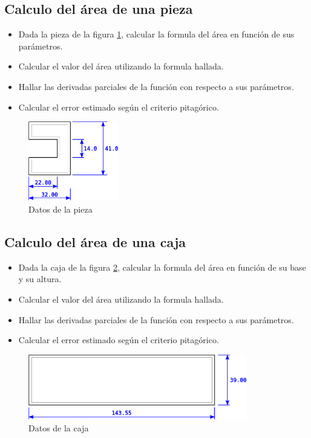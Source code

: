 \documentclass[letter,11pt]{article}
\begin{document}
\subsection{Calculo del área de una pieza}
\begin{itemize}
\item Dada la pieza de la figura \ref{pieza}, calcular la formula del
área en función de sus parámetros.
\item Calcular el valor del área utilizando la formula hallada.
\item Hallar las derivadas parciales de la función con respecto a sus
parámetros.
\item Calcular el error estimado según el criterio pitagórico.
\end{itemize}

\begin{figure}
\centering
\includegraphics[width=0.35\textwidth]{eps/02_03.pieza.eps}
\caption{Datos de la pieza}
\label{pieza}
\end{figure}

\subsection{Calculo del área de una caja}
\begin{itemize}
\item Dada la caja de la figura \ref{caja}, calcular la formula del
área en función de su base y su altura.
\item Calcular el valor del área utilizando la formula hallada.
\item Hallar las derivadas parciales de la función con respecto a sus
parámetros.
\item Calcular el error estimado según el criterio pitagórico.
\end{itemize}

\begin{figure}
\centering
\includegraphics[width=0.85\textwidth]{eps/02_04.caja.eps}
\caption{Datos de la caja}
\label{caja}
\end{figure}
\end{document}
